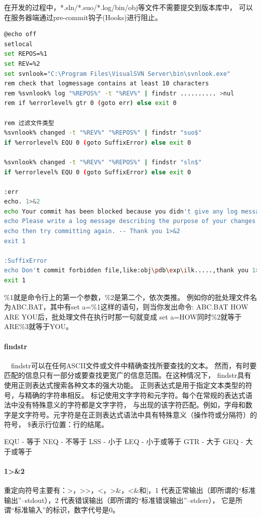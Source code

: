 \documentclass{book}
\begin{document}
在开发的过程中，*.sln/*.suo/*.log/bin/obj等文件不需要提交到版本库中，
可以在服务器端通过pre-commit钩子(Hooks)进行阻止。

\begin{lstlisting}[language=Bash]
@echo off
setlocal
set REPOS=%1
set REV=%2
set svnlook="C:\Program Files\VisualSVN Server\bin\svnlook.exe"
rem check that logmessage contains at least 10 characters
rem %svnlook% log "%REPOS%" -t "%REV%" | findstr .......... >nul
rem if %errorlevel% gtr 0 (goto err) else exit 0

rem 过滤文件类型  
%svnlook% changed -t "%REV%" "%REPOS%" | findstr "suo$"  
if %errorlevel% EQU 0 (goto SuffixError) else exit 0

%svnlook% changed -t "%REV%" "%REPOS%" | findstr "sln$"  
if %errorlevel% EQU 0 (goto SuffixError) else exit 0

:err
echo. 1>&2
echo Your commit has been blocked because you didn't give any log message 1>&2
echo Please write a log message describing the purpose of your changes and 1>&2
echo then try committing again. -- Thank you 1>&2
exit 1

:SuffixError  
echo Don't commit forbidden file,like:obj\pdb\exp\ilk.....,thank you 1>&2  
exit 1
\end{lstlisting}

\%1就是命令行上的第一个参数，\%2是第二个，依次类推。
例如你的批处理文件名为ABC.BAT，其中有set a=\%1这样的语句，则当你发出命令:
ABC.BAT HOW ARE YOU后，批处理文件在执行时那一句就变成
set a=HOW同时\%2就等于ARE\%3就等于YOU。

\paragraph{findstr}~~findstr可以在任何ASCII文件或文件中精确查找所要查找的文本。
然而，有时要匹配的信息只有一部分或要查找更宽广的信息范围。在这种情况下，
findstr具有使用正则表达式搜索各种文本的强大功能。
正则表达式是用于指定文本类型的符号，与精确的字符串相反。
标记使用文字字符和元字符。每个在常规的表达式语法中没有特殊意义的字符都是文字字符，
与出现的该字符匹配。例如，字母和数字是文字符号。元字符是在正则表达式语法中具有特殊意义（操作符或分隔符）的符号，
\$表示行位置：行的结尾。 

EQU - 等于   
NEQ - 不等于   
LSS - 小于 
LEQ - 小于或等于   
GTR - 大于 
GEQ - 大于或等于

\paragraph{1>\&2}重定向符号主要有：>，>>，<，>\&，<\&和|，1
代表正常输出（即所谓的“标准输出”--stdout），2
代表错误输出（即所谓的“标准错误输出”--stderr），
它是所谓“标准输入”的标识，数字代号是0。
\end{document}
